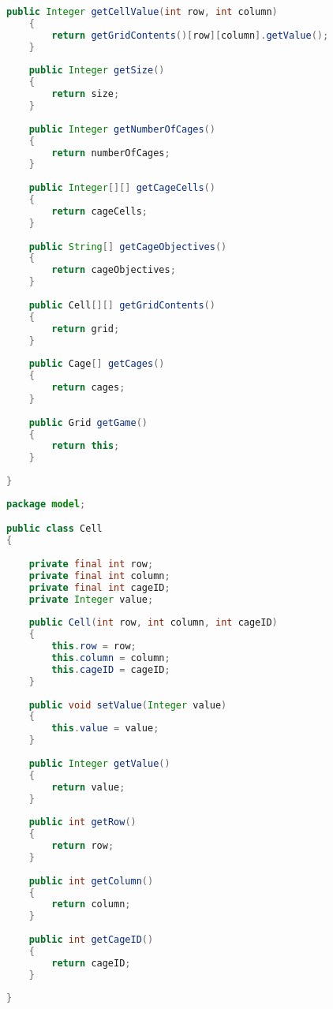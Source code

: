\begin{lstlisting}[language=Java,basicstyle=\tiny,caption=Grid.java]
    public Integer getCellValue(int row, int column)
    {
        return getGridContents()[row][column].getValue();
    }
        
    public Integer getSize()
    {
        return size;
    }
    
    public Integer getNumberOfCages()
    {
        return numberOfCages;
    }
    
    public Integer[][] getCageCells()
    {
        return cageCells;
    } 
    
    public String[] getCageObjectives()
    {
        return cageObjectives;
    }
    
    public Cell[][] getGridContents()
    {
        return grid;
    }
    
    public Cage[] getCages()
    {
        return cages;
    }
    
    public Grid getGame()
    {
        return this;
    }
    
}
\end{lstlisting}

\begin{lstlisting}[language=Java,basicstyle=\tiny,caption=Cell.java]
package model;

public class Cell
{
    
    private final int row;
    private final int column;
    private final int cageID;
    private Integer value;
    
    public Cell(int row, int column, int cageID)
    {
        this.row = row;
        this.column = column;
        this.cageID = cageID;
    }
    
    public void setValue(Integer value)
    {
        this.value = value;
    }
    
    public Integer getValue()
    {
        return value;
    }
    
    public int getRow()
    {
        return row;
    }
     
    public int getColumn()
    {
        return column;
    }
    
    public int getCageID()
    {
        return cageID;
    }
    
}
\end{lstlisting}

